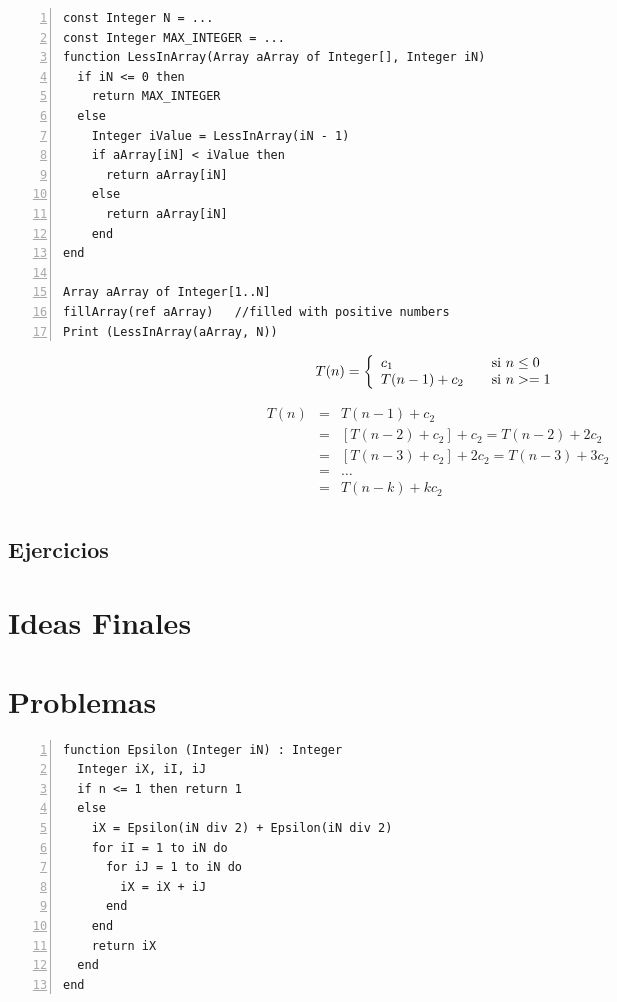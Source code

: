 \begin{lstlisting}[upquote=true, language=pseudo, numbers=left]
const Integer N = ...
const Integer MAX_INTEGER = ...
function LessInArray(Array aArray of Integer[], Integer iN)
  if iN <= 0 then
    return MAX_INTEGER
  else
    Integer iValue = LessInArray(iN - 1)
    if aArray[iN] < iValue then
      return aArray[iN]
    else
      return aArray[iN]
    end
end

Array aArray of Integer[1..N]
fillArray(ref aArray)	//filled with positive numbers
Print (LessInArray(aArray, N))
\end{lstlisting}

\begin{equation}
T(n) = \left\{
  \begin{array}{l l}
    c_1 & \quad \text{si $n \le 0$}\\
    T(n-1) + c_2& \quad \text{si $n >= 1$}
  \end{array} \right.
\end{equation}

\begin{eqnarray*}
T(n)&=&T(n-1) + c_2\\
&=&\left [ T(n-2) + c_2\right ] + c_2 = T(n-2) + 2c_2\\
&=&\left [ T(n-3) + c_2\right ] + 2c_2 = T(n-3) + 3c_2\\
&=&\dots\\
&=&T(n-k) + kc_2\\
\end{eqnarray*}

\subsection{Ejercicios}

\section{Ideas Finales}

\section{Problemas}
\begin{lstlisting}[upquote=true, language=pseudo, numbers=left]
function Epsilon (Integer iN) : Integer
  Integer iX, iI, iJ
  if n <= 1 then return 1
  else
    iX = Epsilon(iN div 2) + Epsilon(iN div 2)
    for iI = 1 to iN do
      for iJ = 1 to iN do
        iX = iX + iJ
      end
    end
    return iX
  end
end
\end{lstlisting}

